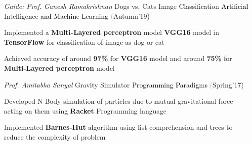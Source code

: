 \begin{cventries}
  \cventry
    {\textit{Guide: Prof. Ganesh Ramakrishnan}}
    {Dogs vs. Cats Image Classification}
    {\textcolor{black} {Artificial Intelligence and Machine Learning}}
    {\fontsize{9pt}{1em} \textcolor{darkgray}(Autumn'19)}
    {
      \begin{cvitems}
        \item Implemented a \textbf{Multi-Layered perceptron} model \textbf{VGG16} model in \textbf{TensorFlow} for classification of image as dog or cat \vspace{0.3mm}
        \item Achieved accuracy of around \textbf{97\%} for \textbf{VGG16} model and around \textbf{75\%} for \textbf{Multi-Layered perceptron} model 
      \end{cvitems}
    }
  \cventry
    {\textit{Prof. Amitabha Sanyal}}
    {Gravity Simulator}
    {\textcolor{black} {Programming Paradigms}}
    {\fontsize{9pt}{1em} \textcolor{darkgray}(Spring'17)}
    {
      \begin{cvitems}
        \item Developed N-Body simulation of particles due to mutual gravitational force acting on them using \textbf{Racket} Programming language\vspace{0.3mm}
        \item Implemented \textbf{Barnes-Hut} algorithm using list comprehension and trees to reduce the complexity of problem
      \end{cvitems}
    }
\end{cventries}
